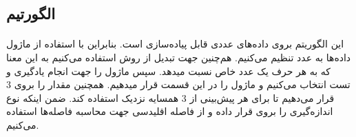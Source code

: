 \documentclass[a4paper,12pt]{article}
\begin{document}
\subsection{الگورتیم }
\paragraph{}
این الگوریتم بروی داده‌های عددی قابل پیاده‌سازی است. بنابراین با استفاده از ماژول  داده‌ها به عدد تنظیم می‌کنیم. هم‌چنین جهت تبدیل از روش  استفاده می‌کنیم به این معنا که به هر حرف یک عدد خاص نسبت میدهد.
سپس ماژول  را جهت انجام یادگیری و تست انتخاب می‌کنیم و ماژول  را در این قسمت قرار میدهیم. همچنین مقدار  را بروی 3 قرار می‌دهیم تا برای هر پیش‌بینی از 3 همسایه نزدیک استفاده کند. ضمن اینکه نوع اندازه‌گیری را بروی  قرار داده و از فاصله اقلیدسی جهت محاسبه فاصله‌ها استفاده می‌کنیم.
\end{document}
